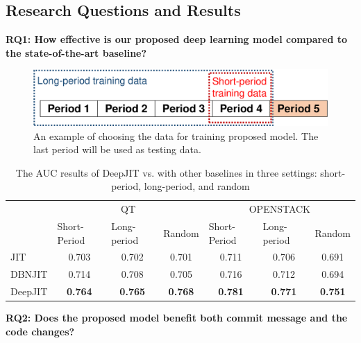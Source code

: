 \subsection{Research Questions and Results}
\label{sec:rq_results}

\noindent \textbf{RQ1: How effective is our proposed deep learning model compared to the state-of-the-art baseline?}

\begin{figure}
\center
\includegraphics[scale=0.36]{figs/split.pdf}
\caption{An example of choosing the data for training proposed model. The last period will be used as testing data.}
\label{fig:splitting}
\end{figure}

\begin{table}[t!]
  \centering
  \caption{The AUC results of DeepJIT vs. with other baselines in three settings: short-period, long-period, and random}
    \begin{tabular}{|l|c|c|c|c|c|c|}
    \hline
    \multirow{2}[4]{*}{} & \multicolumn{3}{c|}{QT} & \multicolumn{3}{c|}{OPENSTACK} \\
\cline{2-7}          & \multicolumn{1}{l|}{Short-Period} & \multicolumn{1}{l|}{Long-period} & \multicolumn{1}{l|}{Random} & \multicolumn{1}{l|}{Short-Period} & \multicolumn{1}{l|}{Long-period} & \multicolumn{1}{l|}{Random} \\
    \hline
    \hline
    JIT   & 0.703 & 0.702 & 0.701 & 0.711 & 0.706 & 0.691 \\
    \hline
    DBNJIT & 0.714 & 0.708 & 0.705 & 0.716 & 0.712 & 0.694 \\
    \hline
    DeepJIT & \textbf{0.764} & \textbf{0.765} & \textbf{0.768} & \textbf{0.781} & \textbf{0.771} & \textbf{0.751} \\
    \hline
    \end{tabular}%
  \label{tab:results}%
\end{table}%

\noindent \textbf{RQ2: Does the proposed model benefit both commit message and the code changes?}

